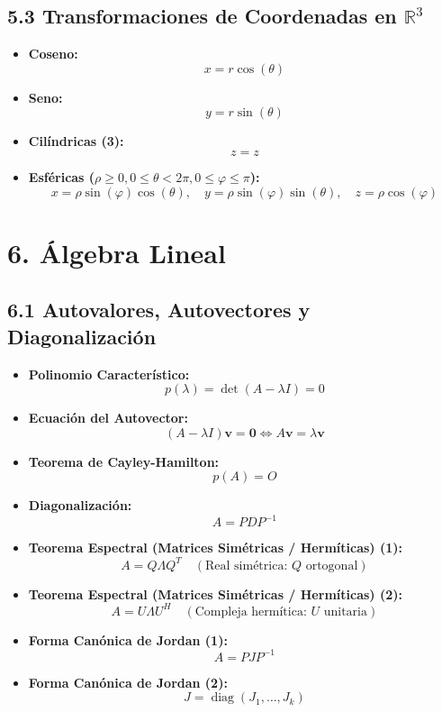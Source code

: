 \documentclass[11pt,a4paper]{article}
\begin{document}
\subsection*{5.3 Transformaciones de Coordenadas en $\mathbb{R}^3$}

\begin{itemize}
  \item \textbf{Coseno:}
  \[
    x = r\cos(\theta)
  \]
  \item \textbf{Seno:}
  \[
    y = r\sin(\theta)
  \]
  \item \textbf{Cilíndricas (3):}
  \[
    z = z
  \]
  \item \textbf{Esféricas ($\rho \ge 0, 0 \le \theta < 2\pi, 0 \le \varphi \le \pi$):}
  \[
    x = \rho\sin(\varphi)\cos(\theta), \quad y = \rho\sin(\varphi)\sin(\theta), \quad z = \rho\cos(\varphi)
  \]
\end{itemize}

\section*{6. Álgebra Lineal}

\subsection*{6.1 Autovalores, Autovectores y Diagonalización}

\begin{itemize}
  \item \textbf{Polinomio Característico:}
  \[
    p(\lambda) = \det(A - \lambda I) = 0
  \]
  \item \textbf{Ecuación del Autovector:}
  \[
    (A - \lambda I)\mathbf{v} = \mathbf{0} \iff A\mathbf{v} = \lambda\mathbf{v}
  \]
  \item \textbf{Teorema de Cayley-Hamilton:}
  \[
    p(A) = O
  \]
  \item \textbf{Diagonalización:}
  \[
    A = PDP^{-1}
  \]
  \item \textbf{Teorema Espectral (Matrices Simétricas / Hermíticas) (1):}
  \[
    A = Q\Lambda Q^T \quad (\text{Real simétrica: } Q \text{ ortogonal})
  \]
  \item \textbf{Teorema Espectral (Matrices Simétricas / Hermíticas) (2):}
  \[
    A = U\Lambda U^H \quad (\text{Compleja hermítica: } U \text{ unitaria})
  \]
  \item \textbf{Forma Canónica de Jordan (1):}
  \[
    A = PJP^{-1}
  \]
  \item \textbf{Forma Canónica de Jordan (2):}
  \[
    J = \operatorname{diag}(J_1, \dots, J_k)
  \]
\end{itemize}
\end{document}
